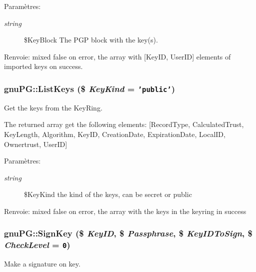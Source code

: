 \begin{Desc}
\item[Param\`{e}tres:]
\begin{description}
\item[{\em string}]\$Key\-Block The PGP block with the key(s). \end{description}
\end{Desc}
\begin{Desc}
\item[Renvoie:]mixed false on error, the array with \mbox{[}Key\-ID, User\-ID\mbox{]} elements of imported keys on success.\end{Desc}
\hypertarget{classgnuPG_a2}{
\subsubsection[ListKeys]{\setlength{\rightskip}{0pt plus 5cm}gnu\-PG::List\-Keys (\$ {\em Key\-Kind} = {\tt 'public'})}}
\label{classgnuPG_a2}


Get the keys from the Key\-Ring.

The returned array get the following elements: \mbox{[}Record\-Type, Calculated\-Trust, Key\-Length, Algorithm, Key\-ID, Creation\-Date, Expiration\-Date, Local\-ID, Ownertrust, User\-ID\mbox{]}

\begin{Desc}
\item[Param\`{e}tres:]
\begin{description}
\item[{\em string}]\$Key\-Kind the kind of the keys, can be secret or public \end{description}
\end{Desc}
\begin{Desc}
\item[Renvoie:]mixed false on error, the array with the keys in the keyring in success\end{Desc}
\hypertarget{classgnuPG_a9}{
\subsubsection[SignKey]{\setlength{\rightskip}{0pt plus 5cm}gnu\-PG::Sign\-Key (\$ {\em Key\-ID}, \$ {\em Passphrase}, \$ {\em Key\-IDTo\-Sign}, \$ {\em Check\-Level} = {\tt 0})}}
\label{classgnuPG_a9}


Make a signature on key.

